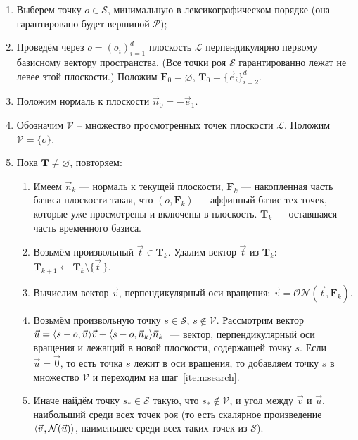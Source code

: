 \documentclass[a4paper,12pt]{article}
\newcommand{\Swarm}{\mathcal{S}}              %
\newcommand{\Polyhedron}{\mathcal{P}}         %
\newcommand{\Viewed}{\mathcal{V}}             %
\newcommand{\ZVec}{\vec 0}                    %
\newcommand{\set}[2][]{#1\{ #2 #1\}}                    %
\newcommand{\scalprod}[3][]{#1\langle #2, #3 #1\rangle} %
\newcommand{\Norm}[2][]{\mathcal{N}#1( #2 #1)} %
\newcommand{\ONorm}[3][]{\mathcal{ON}#1( #2, #3 #1)} %
\newcommand{\TempVec}{\mathbf{T}}  %
\newcommand{\FinalVec}{\mathbf{F}} %
\newcommand{\Plane}{\mathcal{L}}           %
\renewcommand{\.}{\hspace{0.2ex}}
\begin{document}
    \begin{enumerate}
      \item Выберем точку $o \in \Swarm$, минимальную в лексикографическом порядке (она гарантировано будет вершиной $\Polyhedron$);

      \item Проведём через $o=(o_i)_{i = 1}^{d}$ плоскость $\Plane$ перпендикулярно первому базисному вектору пространства. (Все точки роя $\Swarm$ гарантированно лежат не левее этой плоскости.) Положим $\FinalVec_0 = \varnothing$, $\TempVec_0 =  \set{\vec e_i}_{i=2}^d$.

      \item Положим нормаль к плоскости $\vec n_0 = -\vec e_1$.

      \item Обозначим $\Viewed$ -- множество просмотренных точек плоскости $\Plane$. Положим $\Viewed =\set{o}$.

      \item Пока $\TempVec \neq \varnothing$, повторяем:

      \begin{enumerate}
        \item Имеем $\vec n_k$ --- нормаль к текущей плоскости, $\FinalVec_k$ --- накопленная часть базиса плоскости такая, что $(o, \FinalVec_k)$ --- аффинный базис тех точек, которые уже просмотрены и включены в плоскость. $\TempVec_k$ --- оставшаяся часть временного базиса.

        \item Возьмём произвольный $\vec t \in \TempVec_k$. Удалим вектор $\vec t$ из $\TempVec_k$: $\TempVec_{k+1} \leftarrow \TempVec_k \setminus \set{\vec t \,}$.

        \item Вычислим вектор $\vec v$, перпендикулярный оси вращения: $\vec v = \ONorm{\vec t}{\FinalVec_k}$.

        \item Возьмём произвольную точку $s \in \Swarm$, $s \notin \Viewed$. Рассмотрим вектор $\vec u = \scalprod{s - o}{\vec v \.}\vec v + \scalprod{s - o}{\vec n_k}\vec n_k$~--- вектор, перпендикулярный оси вращения и лежащий в новой плоскости, содержащей точку $s$. Если $\vec u = \ZVec$, то есть точка $s$ лежит в оси вращения, то добавляем точку $s$ в множество $\Viewed$ и переходим на шаг~\ref{item:search}.
        \label{item:search}

        \item Иначе найдём точку $s_* \in \Swarm$ такую, что $s_* \notin \Viewed$, и угол между $\vec v$ и $\vec u$, наибольший среди всех точек роя (то есть скалярное произведение $\scalprod{\vec v \.}{\Norm{\vec u}}$, наименьшее среди всех таких точек из $\Swarm$).


\end{enumerate}
\end{enumerate}
\end{document}

